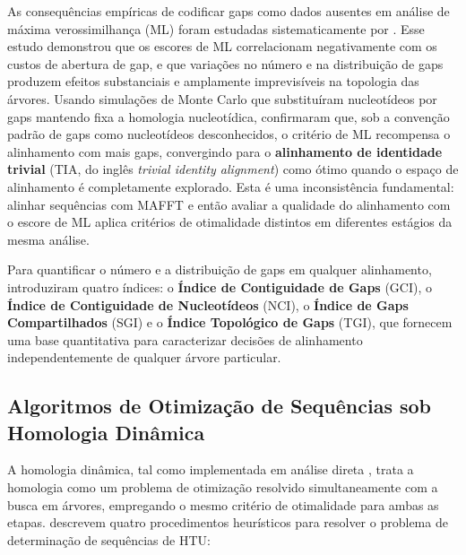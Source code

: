 As consequências empíricas de codificar gaps como dados ausentes em análise de máxima verossimilhança (ML) foram estudadas sistematicamente por \textcite{jacobmachado2021c}. Esse estudo demonstrou que os escores de ML correlacionam negativamente com os custos de abertura de gap, e que variações no número e na distribuição de gaps produzem efeitos substanciais e amplamente imprevisíveis na topologia das árvores. Usando simulações de Monte Carlo que substituíram nucleotídeos por gaps mantendo fixa a homologia nucleotídica, \textcite{jacobmachado2021c} confirmaram que, sob a convenção padrão de gaps como nucleotídeos desconhecidos, o critério de ML recompensa o alinhamento com mais gaps, convergindo para o \textbf{alinhamento de identidade trivial} (TIA, do inglês \textit{trivial identity alignment}) como ótimo quando o espaço de alinhamento é completamente explorado. Esta é uma inconsistência fundamental: alinhar sequências com MAFFT e então avaliar a qualidade do alinhamento com o escore de ML aplica critérios de otimalidade distintos em diferentes estágios da mesma análise.

Para quantificar o número e a distribuição de gaps em qualquer alinhamento, \textcite{jacobmachado2021c} introduziram quatro índices: o \textbf{Índice de Contiguidade de Gaps} (GCI), o \textbf{Índice de Contiguidade de Nucleotídeos} (NCI), o \textbf{Índice de Gaps Compartilhados} (SGI) e o \textbf{Índice Topológico de Gaps} (TGI), que fornecem uma base quantitativa para caracterizar decisões de alinhamento independentemente de qualquer árvore particular.

\subsection{Algoritmos de Otimização de Sequências sob Homologia Dinâmica}

A homologia dinâmica, tal como implementada em análise direta \parencite{wheeler1996}, trata a homologia como um problema de otimização resolvido simultaneamente com a busca em árvores, empregando o mesmo critério de otimalidade para ambas as etapas. \textcite{wheeleretal2006} descrevem quatro procedimentos heurísticos para resolver o problema de determinação de sequências de HTU:

